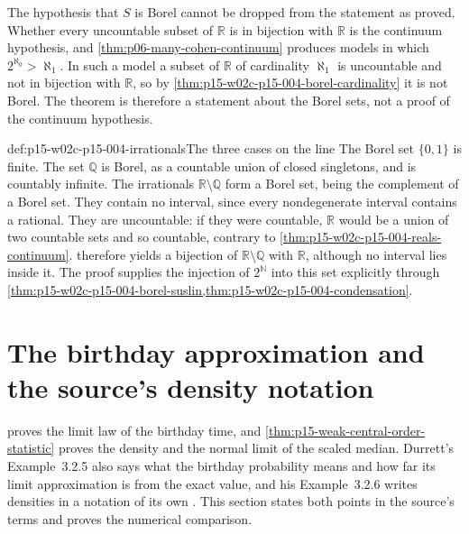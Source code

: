 The hypothesis that \(S\) is Borel cannot be dropped from the statement
as proved. Whether every uncountable subset of \(\mathbb R\) is in
bijection with \(\mathbb R\) is the continuum hypothesis, and
\cref{thm:p06-many-cohen-continuum} produces models in which
\(2^{\aleph_0}>\aleph_1\). In such a model a subset of \(\mathbb R\) of
cardinality \(\aleph_1\) is uncountable and not in bijection with
\(\mathbb R\), so by \cref{thm:p15-w02c-p15-004-borel-cardinality} it is
not Borel. The theorem is therefore a statement about the Borel sets,
not a proof of the continuum hypothesis.

\begin{hbexample}{def:p15-w02c-p15-004-irrationals}{The three cases on the line}
The Borel set \(\{0,1\}\) is finite. The set \(\mathbb Q\) is Borel, as a
countable union of closed singletons, and is countably infinite. The
irrationals \(\mathbb R\setminus\mathbb Q\) form a Borel set, being the
complement of a Borel set. They contain no interval, since every
nondegenerate interval contains a rational. They are uncountable: if they
were countable, \(\mathbb R\) would be a union of two countable sets and
so countable, contrary to \cref{thm:p15-w02c-p15-004-reals-continuum}.
 therefore yields a bijection
of \(\mathbb R\setminus\mathbb Q\) with \(\mathbb R\), although no interval
lies inside it. The proof supplies the injection of \(2^{\mathbb N}\) into
this set explicitly through
\cref{thm:p15-w02c-p15-004-borel-suslin,thm:p15-w02c-p15-004-condensation}.
\end{hbexample}

\section{The birthday approximation and the source's density notation}
\label{sec:p15-w02c-p15-004-examples}

 proves the limit law of the birthday
time, and \cref{thm:p15-weak-central-order-statistic} proves the density
and the normal limit of the scaled median. Durrett's Example~3.2.5 also
says what the birthday probability means and how far its limit
approximation is from the exact value, and his Example~3.2.6 writes
densities in a notation of its own
\cite[pp.~117--118]{DurrettPTEAuthor2019}. This section states both
points in the source's terms and proves the numerical comparison.


